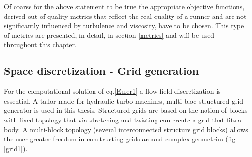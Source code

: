 Of coarse for the above statement to be true the appropriate objective functions, derived out of quality metrics that reflect the real quality of a runner and are not significantly influenced by turbulence and viscosity, have to be chosen. This type of metrics are presented, in detail, in section \ref{metrics} and will be used throughout this chapter. 
 







\subsection{Space discretization - Grid generation}
\label{SpaceDisct}
For the computational solution of eq.\ref{Euler1} a flow field discretization is essential.     
A tailor-made for hydraulic turbo-machines, multi-bloc structured grid generator is used in this thesis. Structured grids are based on the notion of blocks with fixed topology that via stretching and twisting can create a grid that fits a body. A multi-block topology (several interconnected structure grid blocks) allows the user greater freedom in constructing grids around complex geometries (fig.\ref{grid1}). 


